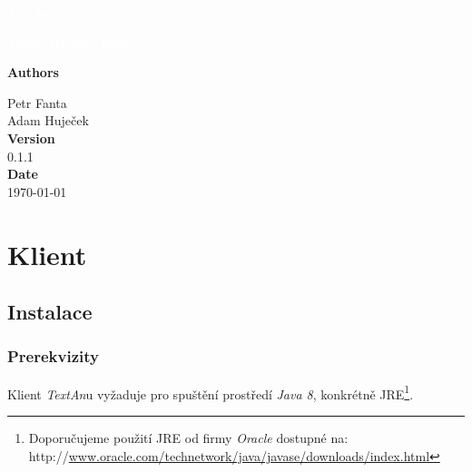 \documentclass[12pt,a4paper]{report}
\newcommand{\textan}{\emph{TextAn}}
\begin{document}
\begin{titlepage}
\BgThispage

\vspace*{0.3\textheight}
\noindent
\textcolor{white}{\bigsf TextAn}

\vspace*{1cm}
\noindent
\textcolor{white}{\Huge\textbf{\textsf{Velmi stručný úvod}}}

\vspace*{2cm}\par
\noindent
\begin{minipage}{0.35\linewidth}
\textbf{Authors}

Petr Fanta\\
Adam Huječek\vspace{40pt} \\
\textbf{Version} \\
0.1.1\vspace{40pt} \\
\textbf{Date} \\
\today \\
\end{minipage}


\end{titlepage}
\restoregeometry

\tableofcontents



\chapter{Klient}

\section{Instalace}

\subsection{Prerekvizity}
Klient \textan u vyžaduje pro spuštění prostředí \emph{Java 8}, konkrétně JRE\footnote{Doporučujeme použití JRE od firmy \emph{Oracle} dostupné na: http://\url{www.oracle.com/technetwork/java/javase/downloads/index.html}}.
\end{document}
